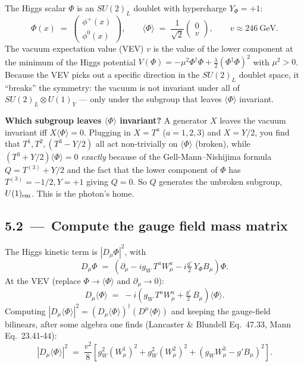 \documentclass[11pt]{article}
\begin{document}
\begin{conceptbox}
The Higgs scalar $\Phi$ is an $SU(2)_L$ doublet with hypercharge $Y_\Phi = +1$:
\[
\Phi(x) \;=\; \begin{pmatrix} \phi^+(x) \\ \phi^0(x) \end{pmatrix},
\qquad
\langle\Phi\rangle \;=\; \frac{1}{\sqrt{2}}\begin{pmatrix} 0 \\ v \end{pmatrix},
\qquad v \approx 246~\text{GeV}.
\]
The vacuum expectation value (VEV) $v$ is the value of the lower component at the minimum
of the Higgs potential $V(\Phi) = -\mu^2 \Phi^\dagger \Phi + \tfrac{\lambda}{2}(\Phi^\dagger \Phi)^2$
with $\mu^2 > 0$. Because the VEV picks out a specific direction in the $SU(2)_L$ doublet
space, it ``breaks'' the symmetry: the vacuum is not invariant under all of
$SU(2)_L \otimes U(1)_Y$ --- only under the subgroup that leaves $\langle\Phi\rangle$
invariant.

\textbf{Which subgroup leaves $\langle\Phi\rangle$ invariant?} A generator $X$ leaves the
vacuum invariant iff $X \langle\Phi\rangle = 0$. Plugging in $X = T^a$ ($a=1,2,3$) and
$X = Y/2$, you find that $T^1, T^2, (T^3 - Y/2)$ all act non-trivially on
$\langle\Phi\rangle$ (broken), while $(T^3 + Y/2) \langle\Phi\rangle = 0$ \emph{exactly}
because of the Gell-Mann--Nishijima formula $Q = T^{(3)} + Y/2$ and the fact that the lower
component of $\Phi$ has $T^{(3)} = -1/2, Y = +1$ giving $Q = 0$. So $Q$ generates the
unbroken subgroup, $U(1)_{\rm em}$. This is the photon's home.
\end{conceptbox}

\subsection*{5.2 \,---\, Compute the gauge field mass matrix}

\begin{stepbox}[title=Step 5.2: Plug $\langle\Phi\rangle$ into the kinetic term]
The Higgs kinetic term is $|D_\mu \Phi|^2$, with
\[
D_\mu \Phi \;=\; \!\left( \partial_\mu - i g_W\, T^a W^a_\mu - i \tfrac{g'}{2}\, Y_\Phi B_\mu \right)\!\Phi.
\]
At the VEV (replace $\Phi \to \langle\Phi\rangle$ and $\partial_\mu \to 0$):
\[
D_\mu \langle\Phi\rangle \;=\; -i\!\left( g_W\, T^a W^a_\mu + \tfrac{g'}{2}\, B_\mu \right)\!\langle\Phi\rangle .
\]
Computing $|D_\mu \langle\Phi\rangle|^2 = (D_\mu \langle\Phi\rangle)^\dagger (D^\mu \langle\Phi\rangle)$
and keeping the gauge-field bilinears, after some algebra one finds (Lancaster \& Blundell
Eq.~47.33, Mann Eq.~23.41-44):
\begin{equation}
|D_\mu \langle\Phi\rangle|^2
\;=\; \frac{v^2}{8} \!\left[ g_W^2 (W^1_\mu)^2 + g_W^2 (W^2_\mu)^2
        + (g_W W^3_\mu - g' B_\mu)^2 \right] .
\label{eq:HiggsMass}
\end{equation}
\end{stepbox}
\end{document}
